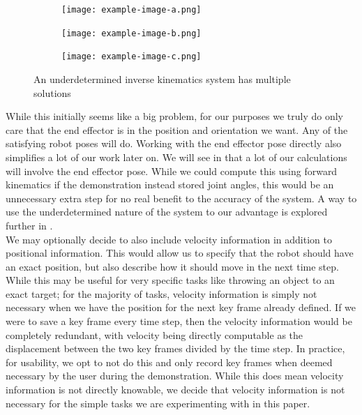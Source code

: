 \begin{figure}[h]
    \centering
    \begin{subfigure}[b]{0.3\textwidth}
        \texttt{[image: example-image-a.png]}
    \end{subfigure}
    \hfill
    \begin{subfigure}[b]{0.3\textwidth}
        \texttt{[image: example-image-b.png]}
    \end{subfigure}
    \hfill
    \begin{subfigure}[b]{0.3\textwidth}
        \texttt{[image: example-image-c.png]}
    \end{subfigure}
    \caption{An underdetermined inverse kinematics system has multiple solutions}
    \label{fig:underdetermined}
\end{figure}

While this initially seems like a big problem, for our purposes we truly do only care that the end effector is in the position and orientation we want. Any of the satisfying robot poses will do. Working with the end effector pose directly also simplifies a lot of our work later on. We will see in  that a lot of our calculations will involve the end effector pose. While we could compute this using forward kinematics if the demonstration instead stored joint angles, this would be an unnecessary extra step for no real benefit to the accuracy of the system. A way to use the underdetermined nature of the system to our advantage is explored further in .\\

We may optionally decide to also include velocity information in addition to positional information. This would allow us to specify that the robot should have an exact position, but also describe how it should move in the next time step. While this may be useful for very specific tasks like throwing an object to an exact target; for the majority of tasks, velocity information is simply not necessary when we have the position for the next key frame already defined. If we were to save a key frame every time step, then the velocity information would be completely redundant, with velocity being directly computable as the displacement between the two key frames divided by the time step. In practice, for usability, we opt to not do this and only record key frames when deemed necessary by the user during the demonstration. While this does mean velocity information is not directly knowable, we decide that velocity information is not necessary for the simple tasks we are experimenting with in this paper.\\

